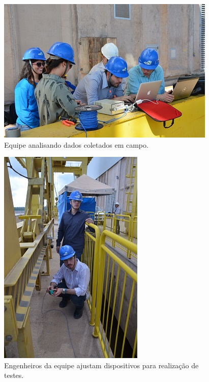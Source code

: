 \begin{figure}[h!]
  \centering
  \includegraphics[width=1\linewidth]{Fotos/JirauJunho2014/7.JPG}
  \caption{Equipe analisando dados coletados em campo.}
  \label{nov20132}
\end{figure}

\begin{figure}[h!]
  \centering
  \includegraphics[width=1\linewidth]{Fotos/JirauJunho2014/8.JPG}
  \caption{Engenheiros da equipe ajustam dispositivos para realização de
  testes.}
  \label{nov20133}
\end{figure}

